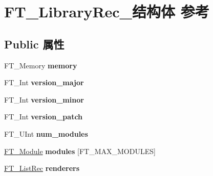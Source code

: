 \hypertarget{struct_f_t___library_rec__}{}\section{F\+T\+\_\+\+Library\+Rec\+\_\+结构体 参考}
\label{struct_f_t___library_rec__}
\subsection*{Public 属性}
\begin{DoxyCompactItemize}
\item 
\mbox{\label{struct_f_t___library_rec___afe392b83bc018b1b1fb25459f68a5861}} 
F\+T\+\_\+\+Memory {\bfseries memory}
\item 
\mbox{\label{struct_f_t___library_rec___a218c30755bac8b58592d70148c938e38}} 
F\+T\+\_\+\+Int {\bfseries version\+\_\+major}
\item 
\mbox{\label{struct_f_t___library_rec___a211d591fbc89d9471715638809865290}} 
F\+T\+\_\+\+Int {\bfseries version\+\_\+minor}
\item 
\mbox{\label{struct_f_t___library_rec___a51ab560542e78c5e65e248b5a94f66a1}} 
F\+T\+\_\+\+Int {\bfseries version\+\_\+patch}
\item 
\mbox{\label{struct_f_t___library_rec___af75d01983c4d91bb3373583424750afa}} 
F\+T\+\_\+\+U\+Int {\bfseries num\+\_\+modules}
\item 
\mbox{\label{struct_f_t___library_rec___af66a4d9e9fbcaa2ff0e18a9cc8d3d89d}} 
\hyperlink{struct_f_t___module_rec__}{F\+T\+\_\+\+Module} {\bfseries modules} \mbox{[}F\+T\+\_\+\+M\+A\+X\+\_\+\+M\+O\+D\+U\+L\+ES\mbox{]}
\item 
\mbox{\label{struct_f_t___library_rec___ad9503f71cf4e4d88edfbdda59eb5e43d}} 
\hyperlink{struct_f_t___list_rec__}{F\+T\+\_\+\+List\+Rec} {\bfseries renderers}
\item 
\mbox{\label{struct_f_t___library_rec___a528dd3298756070ecad7d0f82f009294}} 

\end{DoxyCompactItemize}
